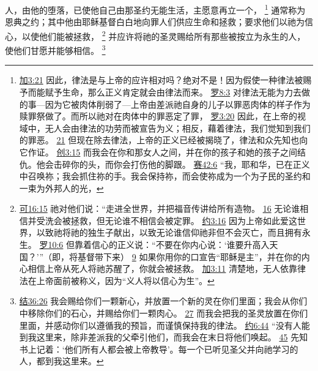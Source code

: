 \documentclass[12pt, a4paper, oneside]{ctexart}
\newcounter{parnum}[section]
\newcommand{\N}{%
   \noindent\refstepcounter{parnum}%
    \makebox[\parindent][l]{\textbf{\arabic{parnum}.}}}
\begin{document}
\N 人，由他的堕落，已使他自己由那圣约无能生活，主愿意再立一个，
	\footnote {
		\href{https://biblehub.com/galatians/3-21.htm}{加3:21} 因此，律法是与上帝的应许相对吗？绝对不是！因为假使一种律法被赐予而能赋予生命，那么正义肯定就会由律法而来。
		\href{https://biblehub.com/romans/8-3.htm}{罗8:3} 对律法无能为力去做的事---因为它被肉体削弱了---上帝由差派祂自身的儿子以罪恶肉体的样子作为赎罪祭做了。而所以祂对在肉体中的罪恶定了罪，
		\href{https://biblehub.com/romans/3-20.htm}{罗3:20} 因此，在上帝的视域中，无人会由律法的功劳而被宣告为义；相反，藉着律法，我们觉知到我们的罪恶。
		\href{https://biblehub.com/romans/3-21.htm}{21} 但现在除去律法，上帝的正义已经被揭晓了，律法和众先知也向它作证。
		\href{https://biblehub.com/genesis/3-15.htm}{创3:15} 而我会在你和那女人之间，并在你的孩子和她的孩子之间结仇。他会击碎你的头，而你会打伤他的脚跟。
		\href{https://biblehub.com/isaiah/42-6.htm}{赛42:6} “我，耶和华，已在正义中召唤祢；我会抓住祢的手。我会保持祢，而会使祢成为一个为子民的圣约和一束为外邦人的光，
	}
	通常称为恩典之约；其中他由耶稣基督白白地向罪人们供应生命和拯救；要求他们以祂为信心，以使他们能被拯救，
	\footnote {
		\href{https://biblehub.com/mark/16-15.htm}{可16:15} 祂对他们说：“走进全世界，并把福音传讲给所有造物。
		\href{https://biblehub.com/mark/16-16.htm}{16} 无论谁相信并受洗会被拯救，但无论谁不相信会被定罪。
		\href{https://biblehub.com/john/3-16.htm}{约3:16} 因为上帝如此爱这世界，以致祂将祂的独生子献出，以致无论谁信仰祂非但不会灭亡，而且拥有永生。
		\href{https://biblehub.com/romans/10-6.htm}{罗10:6} 但靠着信心的正义说：“不要在你内心说：‘谁要升高入天国？’”（即，将基督带下来）
		\href{https://biblehub.com/romans/10-9.htm}{9} 如果你用你的口宣告“耶稣是主”，并在你的内心相信上帝从死人将祂苏醒了，你就会被拯救。
		\href{https://biblehub.com/galatians/3-11.htm}{加3:11} 清楚地，无人依靠律法在上帝面前被称义，因为“义人将以信心为生”。
	}
	并应许将祂的圣灵赐给所有那些被按立为永生的人，使他们甘愿并能够相信。
	\footnote {
		\href{https://biblehub.com/ezekiel/36-26.htm}{结36:26} 我会赐给你们一颗新心，并放置一个新的灵在你们里面；我会从你们中移除你们的石心，并赐给你们一颗肉心。
		\href{https://biblehub.com/ezekiel/36-27.htm}{27} 而我会把我的圣灵放置在你们里面，并感动你们以遵循我的预旨，而谨慎保持我的律法。
		\href{https://biblehub.com/john/6-44.htm}{约6:44} “没有人能到我这里来，除非差派我的父牵引他们，而我会在末日将他们唤起。
		\href{https://biblehub.com/john/6-45.htm}{45} 先知书上记着：‘他们所有人都会被上帝教导’。每一个已听见圣父并向祂学习的人，都到我这里来。
	}
\end{document}
